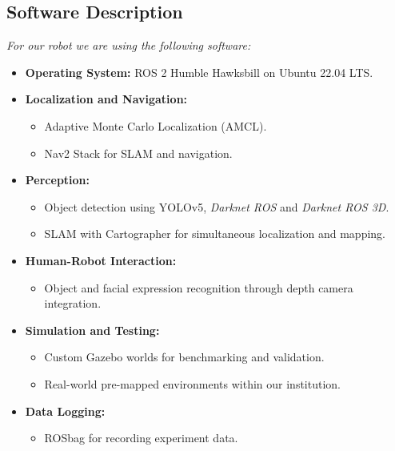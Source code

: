 \subsection*{Software Description}
\textit{For our robot we are using the following software:}
\begin{itemize}
    \item \textbf{Operating System:} ROS 2 Humble Hawksbill on Ubuntu 22.04 LTS.
    \item \textbf{Localization and Navigation:}
        \begin{itemize}
            \item Adaptive Monte Carlo Localization (AMCL).
            \item Nav2 Stack for SLAM and navigation.
        \end{itemize}
    \item \textbf{Perception:}
        \begin{itemize}
            \item Object detection using YOLOv5, \textit{Darknet ROS} and \textit{Darknet ROS 3D}.
            \item SLAM with Cartographer for simultaneous localization and mapping.
        \end{itemize}
    \item \textbf{Human-Robot Interaction:}
        \begin{itemize}
            \item Object and facial expression recognition through depth camera integration.
        \end{itemize}
    \item \textbf{Simulation and Testing:} 
        \begin{itemize}
            \item Custom Gazebo worlds for benchmarking and validation.
            \item Real-world pre-mapped environments within our institution.
        \end{itemize}
    \item \textbf{Data Logging:}
        \begin{itemize}
            \item ROSbag for recording experiment data.
        \end{itemize}
\end{itemize}

